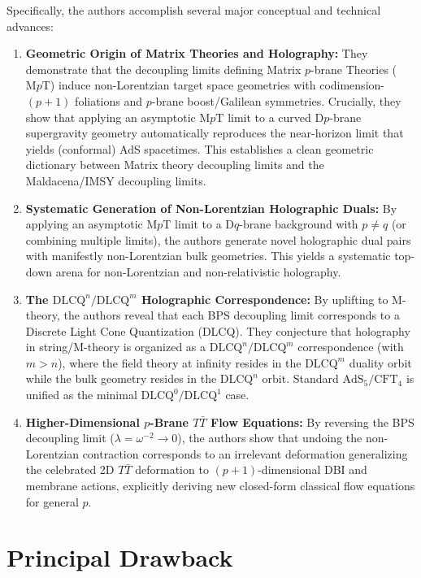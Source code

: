 \documentclass[11pt,a4paper]{article}
\begin{document}
Specifically, the authors accomplish several major conceptual and technical advances:
\begin{enumerate}
    \item \textbf{Geometric Origin of Matrix Theories and Holography:} 
    They demonstrate that the decoupling limits defining Matrix $p$-brane Theories ($\text{M}p\text{T}$) induce non-Lorentzian target space geometries with codimension-$(p+1)$ foliations and $p$-brane boost/Galilean symmetries. Crucially, they show that applying an asymptotic $\text{M}p\text{T}$ limit to a curved $\text{D}p$-brane supergravity geometry automatically reproduces the near-horizon limit that yields (conformal) AdS spacetimes. This establishes a clean geometric dictionary between Matrix theory decoupling limits and the Maldacena/IMSY decoupling limits.

    \item \textbf{Systematic Generation of Non-Lorentzian Holographic Duals:} 
    By applying an asymptotic $\text{M}p\text{T}$ limit to a $\text{D}q$-brane background with $p \neq q$ (or combining multiple limits), the authors generate novel holographic dual pairs with manifestly non-Lorentzian bulk geometries. This yields a systematic top-down arena for non-Lorentzian and non-relativistic holography.

    \item \textbf{The $\text{DLCQ}^n/\text{DLCQ}^m$ Holographic Correspondence:} 
    By uplifting to M-theory, the authors reveal that each BPS decoupling limit corresponds to a Discrete Light Cone Quantization (DLCQ). They conjecture that holography in string/M-theory is organized as a $\text{DLCQ}^n/\text{DLCQ}^m$ correspondence (with $m > n$), where the field theory at infinity resides in the $\text{DLCQ}^m$ duality orbit while the bulk geometry resides in the $\text{DLCQ}^n$ orbit. Standard $\text{AdS}_5/\text{CFT}_4$ is unified as the minimal $\text{DLCQ}^0/\text{DLCQ}^1$ case.

    \item \textbf{Higher-Dimensional $p$-Brane $T\bar{T}$ Flow Equations:} 
    By reversing the BPS decoupling limit ($\lambda = \omega^{-2} \to 0$), the authors show that undoing the non-Lorentzian contraction corresponds to an irrelevant deformation generalizing the celebrated 2D $T\bar{T}$ deformation to $(p+1)$-dimensional DBI and membrane actions, explicitly deriving new closed-form classical flow equations for general $p$.
\end{enumerate}

\section{Principal Drawback}
\end{document}
